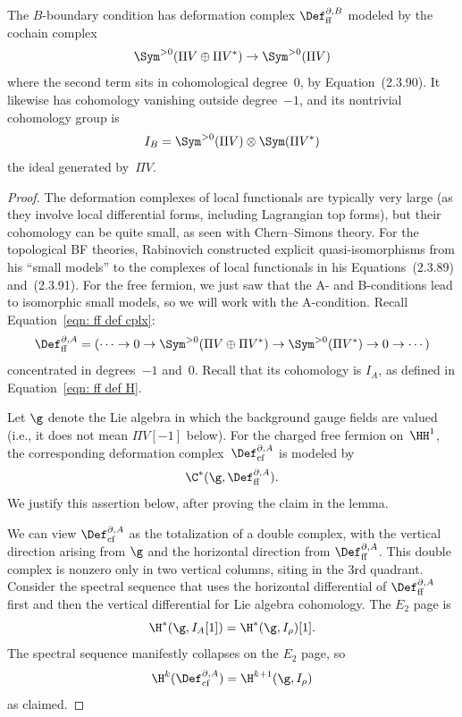 \documentclass[10pt]{amsart}
\begin{document}
The $B$-boundary condition has deformation complex $\Def^{\partial,B}_{\rm ff}$
modeled by the cochain complex
\[
\Sym^{>0}(\Pi V \oplus \Pi V^*) \to \Sym^{>0}(\Pi V)
\]
where the second term sits in cohomological degree~0,
by Equation~(2.3.90).
It likewise has cohomology vanishing outside degree~$-1$, and its nontrivial cohomology group is 
\[
I_B = \Sym^{>0}(\Pi V) \otimes \Sym(\Pi V^*)
\]
the ideal generated by~$\Pi V$.

\begin{proof}
The deformation complexes of local functionals are typically very large (as they involve local differential forms, including Lagrangian top forms),
but their cohomology can be quite small, as seen with Chern--Simons theory.
For the topological BF theories,
Rabinovich constructed explicit quasi-isomorphisms from his ``small models'' to the complexes of local functionals in his Equations~(2.3.89) and~(2.3.91).
For the free fermion, we just saw that the A- and B-conditions lead to isomorphic small models,
so we will work with the A-condition.
Recall Equation~\eqref{eqn: ff def cplx}:
\[
\Def^{\partial,A}_{\rm ff} = (\cdots \to 0 \to \Sym^{>0}(\Pi V \oplus \Pi V^*) \to \Sym^{>0}(\Pi V^*) \to 0 \to \cdots)
\]
concentrated in degrees~$-1$ and~0.
Recall that its cohomology is $I_A$, as defined in Equation~\eqref{eqn: ff def H}.

Let $\g$ denote the Lie algebra in which the background gauge fields are valued (i.e., it does not mean $\Pi V[-1]$ below).
For the charged free fermion on~$\HH^1$,
the corresponding deformation complex~$\Def^{\partial,A}_{\rm cf}$ is modeled by
\[
\C^*(\g, \Def^{\partial,A}_{\rm ff}).
\]
We justify this assertion below, 
after proving the claim in the lemma.

We can view $\Def^{\partial,A}_{\rm cf}$ as the totalization of a double complex, 
with the vertical direction arising from $\g$ and the horizontal direction from $\Def^{\partial,A}_{\rm ff}$.
This double complex is nonzero only in two vertical columns,
siting in the 3rd quadrant.
Consider the spectral sequence that uses the horizontal differential of $\Def^{\partial,A}_{\rm ff}$ first and then the vertical differential for Lie algebra cohomology.
The $E_2$ page is 
\[
\H^*(\g, I_A[1]) = \H^*(\g, I_\rho)[1].
\]
The spectral sequence manifestly collapses on the $E_2$ page,
so
\[
\H^k(\Def^{\partial,A}_{\rm cf}) = \H^{k+1}(\g, I_\rho)
\]
as claimed.


\end{proof}
\end{document}
